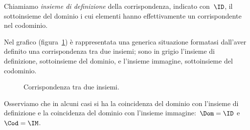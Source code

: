 \begin{definizione}
Chiamiamo \emph{insieme di definizione} della corrispondenza, indicato 
con~$\ID$, il sottoinsieme del dominio i cui elementi hanno effettivamente un 
corrispondente nel codominio.
\end{definizione}

Nel grafico (figura~\ref{fig:C.3}) è rappresentata una generica situazione 
formatasi dall'aver definito una corrispondenza tra due insiemi; sono in grigio 
l'insieme di definizione, sottoinsieme del dominio,
e l'insieme immagine, sottoinsieme del codominio.
\begin{inaccessibleblock}
 \begin{figure}[b]
 \centering
 \caption{Corrispondenza tra due insiemi.}\label{fig:C.3}
\end{figure}
\end{inaccessibleblock}

Osserviamo che in alcuni casi si ha la coincidenza del dominio con l'insieme di 
definizione e la coincidenza del dominio con l'insieme immagine:~$\Dom=\ID$ 
e~$\Cod=\IM$.

